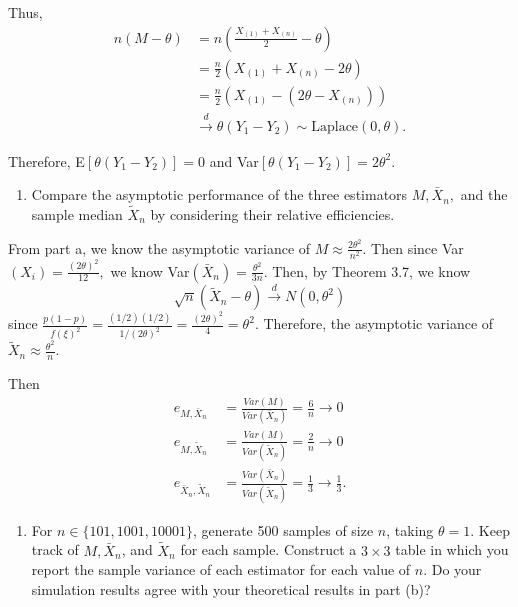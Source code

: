 \documentclass[12pt,]{article}
\providecommand{\tightlist}{%
  \setlength{\itemsep}{0pt}\setlength{\parskip}{0pt}}
\begin{document}
Thus, \begin{align*}
n(M-\theta) & = n(\frac{X_{(1)}+X_{(n)}}{2}-\theta)\\
& = \frac{n}{2}(X_{(1)}+X_{(n)}-2\theta)\\
& = \frac{n}{2}\left(X_{(1)}- (2\theta - X_{(n)})\right)\\
&\overset{d}\rightarrow \theta(Y_1 - Y_2) \sim \text{Laplace}(0,\theta).
\end{align*}

Therefore, E\([\theta(Y_1 - Y_2)]=0\) and
Var\([\theta(Y_1 - Y_2)]=2\theta^2.\)

\begin{enumerate}
\def\labelenumi{(\alph{enumi})}
\setcounter{enumi}{1}
\tightlist
\item
  Compare the asymptotic performance of the three estimators
  \(M, \bar X_n,\) and the sample median \(\tilde X_n\) by considering
  their relative efficiencies.
\end{enumerate}

From part a, we know the asymptotic variance of
\(M\approx \frac{2\theta^2}{n^2}\). Then since
Var\((X_i) = \frac{(2\theta)^2}{12},\) we know
Var\((\bar X_n) = \frac{\theta^2}{3n}\). Then, by Theorem 3.7, we know
\[\sqrt{n}(\tilde X_n- \theta) \overset{d}\rightarrow N(0,\theta^2)\]
since
\(\frac{p(1-p)}{f(\xi)^2}=\frac{(1/2)(1/2)}{1/(2\theta)^2}=\frac{(2\theta)^2}{4}=\theta^2.\)
Therefore, the asymptotic variance of
\(\tilde X_n \approx \frac{\theta^2}{n}.\)

Then \begin{align*}
e_{M,\bar X_n} & = \frac{Var(M)}{Var(\bar X_n)}= \frac{6}{n} \rightarrow 0\\
e_{M,\tilde X_n} & = \frac{Var(M)}{Var(\tilde X_n)}= \frac{2}{n} \rightarrow 0\\
e_{\bar X_n, \tilde X_n} & = \frac{Var(\bar X_n)}{Var(\tilde X_n)}= \frac{1}{3} \rightarrow \frac{1}{3}.
\end{align*}

\begin{enumerate}
\def\labelenumi{(\alph{enumi})}
\setcounter{enumi}{2}
\tightlist
\item
  For \(n\in \{101, 1001, 10001\}\), generate 500 samples of size \(n\),
  taking \(\theta = 1.\) Keep track of \(M,\bar X_n\), and
  \(\tilde X_n\) for each sample. Construct a \(3 \times 3\) table in
  which you report the sample variance of each estimator for each value
  of \(n\). Do your simulation results agree with your theoretical
  results in part (b)?
\end{enumerate}
\end{document}
